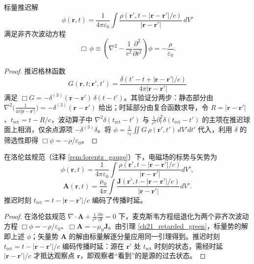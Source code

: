 \begin{lemma}[推迟势满足非齐次波动方程]\label{ch21_retarded_green}
标量推迟解
\[
\phi(\mathbf{r},t) = \frac{1}{4\pi\varepsilon_0}\int \frac{\rho(\mathbf{r}', t-|\mathbf{r}-\mathbf{r}'|/c)}{|\mathbf{r}-\mathbf{r}'|}\,dV'
\]
满足非齐次波动方程
\[
\Box\,\phi \equiv \left(\nabla^2 - \frac{1}{c^2}\frac{\partial^2}{\partial t^2}\right)\phi = -\frac{\rho}{\varepsilon_0}.
\]
\end{lemma}

\begin{proof}
推迟格林函数
\[
G(\mathbf{r},t;\mathbf{r}',t') = \frac{\delta(t'-t+|\mathbf{r}-\mathbf{r}'|/c)}{4\pi|\mathbf{r}-\mathbf{r}'|}
\]
满足 $\Box G = -\delta^{(3)}(\mathbf{r}-\mathbf{r}')\,\delta(t-t')$。其验证分两步：静态部分由 $\nabla^2\bigl(\frac{1}{4\pi|\mathbf{r}-\mathbf{r}'|}\bigr) = -\delta^{(3)}(\mathbf{r}-\mathbf{r}')$ 给出；时延部分由复合函数求导，令 $R=|\mathbf{r}-\mathbf{r}'|$、$t_{\text{ret}} = t - R/c$，波动算子中 $\nabla^2\delta(t_{\text{ret}}-t')$ 与 $\frac{1}{c^2}\partial_t^2\delta(t_{\text{ret}}-t')$ 的主项在推迟球面上相消，仅余点源项 $-\delta^{(3)}\delta$。将 $\phi = \frac{1}{\varepsilon_0}\iint G\,\rho(\mathbf{r}',t')\,dV'dt'$ 代入，利用 $\delta$ 的筛选性即得 $\Box\phi = -\rho/\varepsilon_0$。
\end{proof}

\begin{theorem}[推迟势]\label{thm:retarded_potential}
在洛伦兹规范（注释 \ref{rem:lorentz_gauge}）下，电磁场的标势与矢势为
\[
\phi(\mathbf{r}, t) = \frac{1}{4\pi\varepsilon_0} \int \frac{\rho(\mathbf{r}', t - |\mathbf{r}-\mathbf{r}'|/c)}{|\mathbf{r}-\mathbf{r}'|} dV',
\]
\[
\mathbf{A}(\mathbf{r}, t) = \frac{\mu_0}{4\pi} \int \frac{\mathbf{J}(\mathbf{r}', t - |\mathbf{r}-\mathbf{r}'|/c)}{|\mathbf{r}-\mathbf{r}'|} dV'.
\]
推迟时刻 $t_{\text{ret}} = t - |\mathbf{r}-\mathbf{r}'|/c$ 编码了传播时延。
\end{theorem}

\begin{proof}
在洛伦兹规范 $\nabla\cdot\mathbf{A} + \frac{1}{c^2}\frac{\partial\phi}{\partial t} = 0$ 下，麦克斯韦方程组退化为两个非齐次波动方程 $\Box\phi = -\rho/\varepsilon_0$、$\Box\mathbf{A} = -\mu_0\mathbf{J}$。由引理 \ref{ch21_retarded_green}，标量势的解即上述 $\phi$；矢量势 $\mathbf{A}$ 的解由标量解逐分量应用同一引理得到。推迟时刻 $t_{\text{ret}} = t - |\mathbf{r}-\mathbf{r}'|/c$ 编码传播时延：源在 $\mathbf{r}'$ 处 $t_{\text{ret}}$ 时刻的状态，需经时延 $|\mathbf{r}-\mathbf{r}'|/c$ 才抵达观察点 $\mathbf{r}$，即观察者“看到”的是源的过去状态。
\end{proof}

